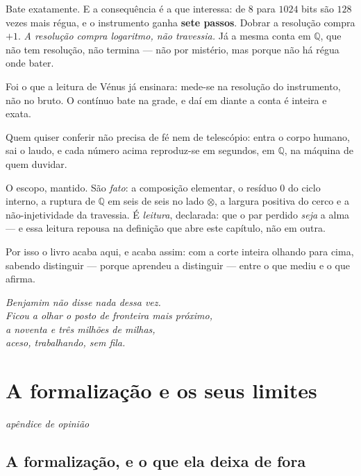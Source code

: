 \documentclass[11pt]{article}
\newcommand{\Q}{\mathbb Q}
\theoremstyle{plain}
\theoremstyle{remark}
\begin{document}
\noindent Bate exatamente. E a consequência é a que interessa: de $8$ para $1024$
bits são $128$ vezes mais régua, e o instrumento ganha \textbf{sete passos}.
Dobrar a resolução compra $+1$. \emph{A resolução compra logaritmo, não
travessia.} Já a mesma conta em $\Q$, que não tem resolução, não termina --- não
por mistério, mas porque não há régua onde bater.

\medskip
\noindent Foi o que a leitura de Vénus já ensinara: mede-se na resolução do
instrumento, não no bruto. O contínuo bate na grade, e daí em diante a conta é
inteira e exata.

\medskip
\noindent Quem quiser conferir não precisa de fé nem de telescópio: entra o corpo humano, sai o laudo, e
cada número acima reproduz-se em segundos, em $\Q$, na máquina de quem duvidar.

\medskip
\noindent O escopo, mantido. São \emph{fato}: a composição elementar, o resíduo
$0$ do ciclo interno, a ruptura de $\Q$ em seis de seis no lado $\otimes$, a
largura positiva do cerco e a não-injetividade da travessia. É \emph{leitura},
declarada: que o par perdido \emph{seja} a alma --- e essa leitura repousa na
definição que abre este capítulo, não em outra.

\medskip
\noindent Por isso o livro acaba aqui, e acaba assim: com a corte inteira olhando
para cima, sabendo distinguir --- porque aprendeu a distinguir --- entre o que
mediu e o que afirma.

\begin{center}
\emph{Benjamim não disse nada dessa vez.}\\
\emph{Ficou a olhar o posto de fronteira mais próximo,}\\
\emph{a noventa e três milhões de milhas,}\\
\emph{aceso, trabalhando, sem fila.}
\end{center}



\section{A formalização e os seus limites}

\noindent\emph{apêndice de opinião}

\subsection{A formalização, e o que ela deixa de fora}
\end{document}
